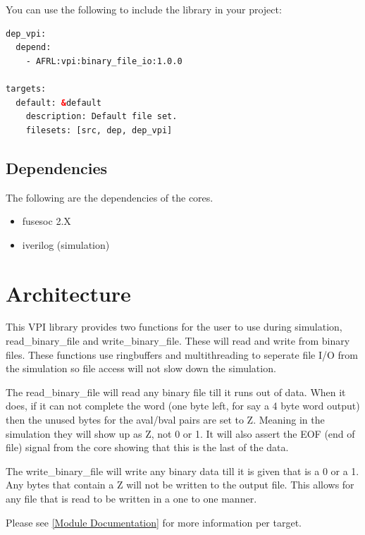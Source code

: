 You can use the following to include the library in your project:

\begin{lstlisting}[language=XML]
dep_vpi:
  depend:
    - AFRL:vpi:binary_file_io:1.0.0

targets:
  default: &default
    description: Default file set.
    filesets: [src, dep, dep_vpi]
\end{lstlisting}

\subsection{Dependencies}

\par
The following are the dependencies of the cores.

\begin{itemize}
  \item fusesoc 2.X
  \item iverilog (simulation)
\end{itemize}



\section{Architecture}
\par
This VPI library provides two functions for the user to use during simulation, read\_binary\_file and write\_binary\_file. These will read and
write from binary files. These functions use ringbuffers and multithreading to seperate file I/O from the simulation so file access will not
slow down the simulation.
\par
The read\_binary\_file will read any binary file till it runs out of data. When it does, if it can not complete the word (one byte left, for say a 4 byte word output)
then the unused bytes for the aval/bval pairs are set to Z. Meaning in the simulation they will show up as Z, not 0 or 1. It will also assert the EOF (end of file) signal
from the core showing that this is the last of the data.
\par
The write\_binary\_file will write any binary data till it is given that is a 0 or a 1. Any bytes that contain a Z will not be written to the output file. This allows for
any file that is read to be written in a one to one manner.

Please see \ref{Module Documentation} for more information per target.

